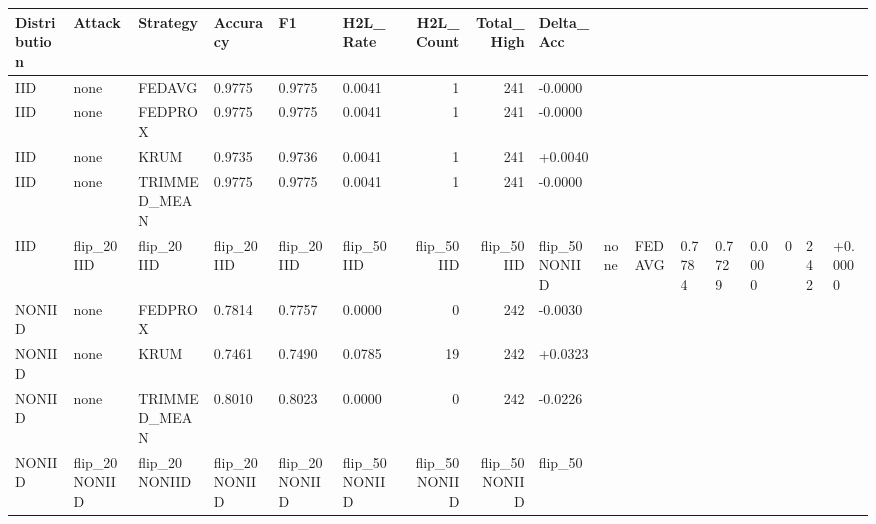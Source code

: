 \begin{tabular}{llllllrrl}
\toprule
Distribution & Attack & Strategy & Accuracy & F1 & H2L_Rate & H2L_Count & Total_High & Delta_Acc \\
\midrule
IID & none & FEDAVG & 0.9775 & 0.9775 & 0.0041 & 1 & 241 & -0.0000 \\
IID & none & FEDPROX & 0.9775 & 0.9775 & 0.0041 & 1 & 241 & -0.0000 \\
IID & none & KRUM & 0.9735 & 0.9736 & 0.0041 & 1 & 241 & +0.0040 \\
IID & none & TRIMMED_MEAN & 0.9775 & 0.9775 & 0.0041 & 1 & 241 & -0.0000 \\
IID & flip_20%
IID & flip_20%
IID & flip_20%
IID & flip_20%
IID & flip_50%
IID & flip_50%
IID & flip_50%
IID & flip_50%
NONIID & none & FEDAVG & 0.7784 & 0.7729 & 0.0000 & 0 & 242 & +0.0000 \\
NONIID & none & FEDPROX & 0.7814 & 0.7757 & 0.0000 & 0 & 242 & -0.0030 \\
NONIID & none & KRUM & 0.7461 & 0.7490 & 0.0785 & 19 & 242 & +0.0323 \\
NONIID & none & TRIMMED_MEAN & 0.8010 & 0.8023 & 0.0000 & 0 & 242 & -0.0226 \\
NONIID & flip_20%
NONIID & flip_20%
NONIID & flip_20%
NONIID & flip_20%
NONIID & flip_50%
NONIID & flip_50%
NONIID & flip_50%
NONIID & flip_50%
\bottomrule
\end{tabular}

